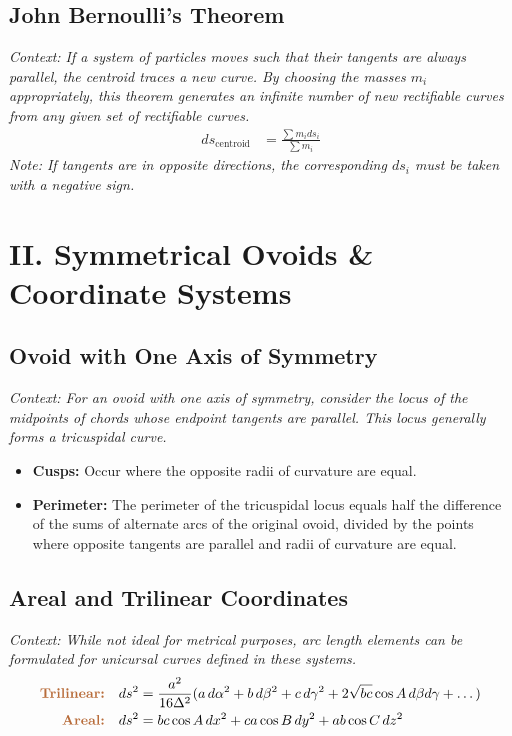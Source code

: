 \documentclass[11pt, a4paper]{article}
\begin{document}
\vspace{0.3cm}

\subsection*{\color{secondary} John Bernoulli's Theorem}
\textit{\small Context: If a system of particles moves such that their tangents are always parallel, the centroid traces a new curve. By choosing the masses $m_i$ appropriately, this theorem generates an infinite number of new rectifiable curves from any given set of rectifiable curves.}
\begin{align*}
    ds_{\text{centroid}} &= \frac{\sum m_i ds_i}{\sum m_i}
\end{align*}
\textit{\small Note: If tangents are in opposite directions, the corresponding $ds_i$ must be taken with a negative sign.}


\section*{\color{primary} II. Symmetrical Ovoids \& Coordinate Systems}

\subsection*{\color{secondary} Ovoid with One Axis of Symmetry}
\textit{\small Context: For an ovoid with one axis of symmetry, consider the locus of the midpoints of chords whose endpoint tangents are parallel. This locus generally forms a tricuspidal curve.}
\begin{itemize}[leftmargin=*, nosep]
    \item \textbf{\color{accent}Cusps:} Occur where the opposite radii of curvature are equal.
    \item \textbf{\color{accent}Perimeter:} The perimeter of the tricuspidal locus equals half the difference of the sums of alternate arcs of the original ovoid, divided by the points where opposite tangents are parallel and radii of curvature are equal.
\end{itemize}

\subsection*{\color{secondary} Areal and Trilinear Coordinates}
\textit{\small Context: While not ideal for metrical purposes, arc length elements can be formulated for unicursal curves defined in these systems.}
\begin{align*}
    \textbf{\color{accent}Trilinear:} \quad ds^2 &= \frac{a^2}{16\Delta^2} (a \, d\alpha^2 + b \, d\beta^2 + c \, d\gamma^2 + 2\sqrt{bc}\cos A \, d\beta d\gamma + \dots) \\
    \textbf{\color{accent}Areal:} \quad ds^2 &= bc \cos A \, dx^2 + ca \cos B \, dy^2 + ab \cos C \, dz^2
\end{align*}
\end{document}
